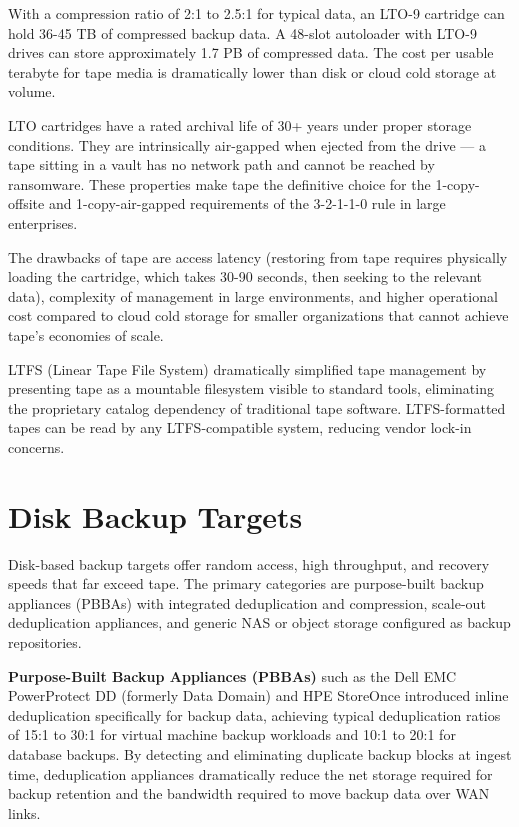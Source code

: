 With a compression ratio of 2:1 to 2.5:1 for typical data, an LTO-9 cartridge can hold 36-45 TB of compressed backup data. A 48-slot autoloader with LTO-9 drives can store approximately 1.7 PB of compressed data. The cost per usable terabyte for tape media is dramatically lower than disk or cloud cold storage at volume.

LTO cartridges have a rated archival life of 30+ years under proper storage conditions. They are intrinsically air-gapped when ejected from the drive --- a tape sitting in a vault has no network path and cannot be reached by ransomware. These properties make tape the definitive choice for the 1-copy-offsite and 1-copy-air-gapped requirements of the 3-2-1-1-0 rule in large enterprises.

The drawbacks of tape are access latency (restoring from tape requires physically loading the cartridge, which takes 30-90 seconds, then seeking to the relevant data), complexity of management in large environments, and higher operational cost compared to cloud cold storage for smaller organizations that cannot achieve tape's economies of scale.

LTFS (Linear Tape File System) dramatically simplified tape management by presenting tape as a mountable filesystem visible to standard tools, eliminating the proprietary catalog dependency of traditional tape software. LTFS-formatted tapes can be read by any LTFS-compatible system, reducing vendor lock-in concerns.

\section{Disk Backup Targets}
Disk-based backup targets offer random access, high throughput, and recovery speeds that far exceed tape. The primary categories are purpose-built backup appliances (PBBAs) with integrated deduplication and compression, scale-out deduplication appliances, and generic NAS or object storage configured as backup repositories.

\textbf{Purpose-Built Backup Appliances (PBBAs)} such as the Dell EMC PowerProtect DD (formerly Data Domain) and HPE StoreOnce introduced inline deduplication specifically for backup data, achieving typical deduplication ratios of 15:1 to 30:1 for virtual machine backup workloads and 10:1 to 20:1 for database backups. By detecting and eliminating duplicate backup blocks at ingest time, deduplication appliances dramatically reduce the net storage required for backup retention and the bandwidth required to move backup data over WAN links.


